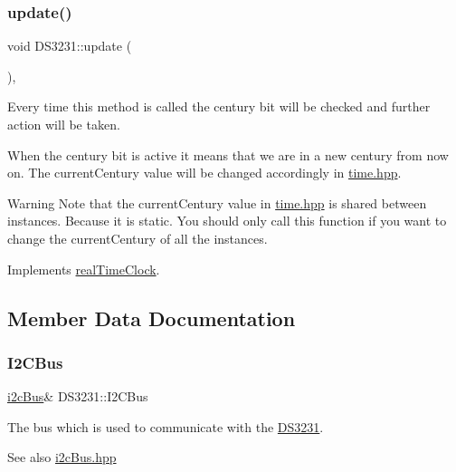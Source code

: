\subsubsection{\texorpdfstring{update()}{update()}}
{\footnotesize\ttfamily void D\+S3231\+::update (\begin{DoxyParamCaption}{ }\end{DoxyParamCaption})\hspace{0.3cm}{\ttfamily [override]}, {\ttfamily [virtual]}}



Every time this method is called the century bit will be checked and further action will be taken. 

When the century bit is active it means that we are in a new century from now on. The current\+Century value will be changed accordingly in \mbox{\hyperlink{time_8hpp_source}{time.\+hpp}}. \begin{DoxyWarning}{Warning}
Note that the current\+Century value in \mbox{\hyperlink{time_8hpp_source}{time.\+hpp}} is shared between instances. Because it is static. You should only call this function if you want to change the current\+Century of all the instances. 
\end{DoxyWarning}


Implements \mbox{\hyperlink{classreal_time_clock_afb5132ca3cbe80552a88041cead0a2b3}{real\+Time\+Clock}}.



\subsection{Member Data Documentation}
\mbox{\label{class_d_s3231_acffbcfc655349fd392b97dff5f18a56f}} 
\subsubsection{\texorpdfstring{I2\+C\+Bus}{I2CBus}}
{\footnotesize\ttfamily \mbox{\hyperlink{classi2c_bus}{i2c\+Bus}}\& D\+S3231\+::\+I2\+C\+Bus\hspace{0.3cm}{\ttfamily [private]}}



The bus which is used to communicate with the \mbox{\hyperlink{class_d_s3231}{D\+S3231}}. 

\begin{DoxySeeAlso}{See also}
\mbox{\hyperlink{i2c_bus_8hpp_source}{i2c\+Bus.\+hpp}} 
\end{DoxySeeAlso}
\mbox{\label{class_d_s3231_a15fb987b624cdddde40a15db36665221}} 
